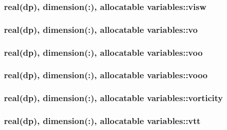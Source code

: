 \hypertarget{classvariables_a44c130feaa1e773ec5250ba9fd2fe354}{
\subsubsection[{visw}]{\setlength{\rightskip}{0pt plus 5cm}real(dp), dimension(\-:), allocatable variables\-::visw}}\label{classvariables_a44c130feaa1e773ec5250ba9fd2fe354}
\hypertarget{classvariables_a8e3c73f60505e097eebbe0a368d08e55}{
\subsubsection[{vo}]{\setlength{\rightskip}{0pt plus 5cm}real(dp), dimension(\-:), allocatable variables\-::vo}}\label{classvariables_a8e3c73f60505e097eebbe0a368d08e55}
\hypertarget{classvariables_a5822aea71754a3cd7092d949a83b2791}{
\subsubsection[{voo}]{\setlength{\rightskip}{0pt plus 5cm}real(dp), dimension(\-:), allocatable variables\-::voo}}\label{classvariables_a5822aea71754a3cd7092d949a83b2791}
\hypertarget{classvariables_ae37a5baff84f1f71a83c36e78d81a137}{
\subsubsection[{vooo}]{\setlength{\rightskip}{0pt plus 5cm}real(dp), dimension(\-:), allocatable variables\-::vooo}}\label{classvariables_ae37a5baff84f1f71a83c36e78d81a137}
\hypertarget{classvariables_a9d202bc1b4e97e3af595e8e4baaa9bee}{
\subsubsection[{vorticity}]{\setlength{\rightskip}{0pt plus 5cm}real(dp), dimension(\-:), allocatable variables\-::vorticity}}\label{classvariables_a9d202bc1b4e97e3af595e8e4baaa9bee}
\hypertarget{classvariables_a446974075a477e4f4311dd2919bd1c3e}{
\subsubsection[{vtt}]{\setlength{\rightskip}{0pt plus 5cm}real(dp), dimension(\-:), allocatable variables\-::vtt}}\label{classvariables_a446974075a477e4f4311dd2919bd1c3e}
